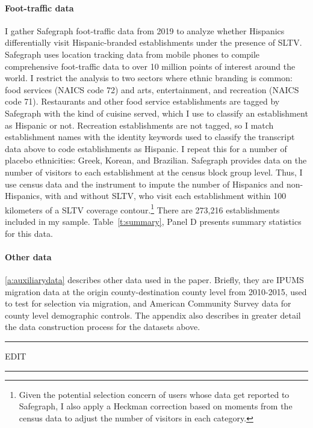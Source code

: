 \documentclass[11pt]{article}
\begin{document}
\paragraph{Foot-traffic data} I gather Safegraph foot-traffic data from 2019 to analyze whether Hispanics differentially visit Hispanic-branded establishments under the presence of SLTV. Safegraph uses location tracking data from mobile phones to compile comprehensive foot-traffic data to over 10 million points of interest around the world. I restrict the analysis to two sectors where ethnic branding is common: food services (NAICS code 72) and arts, entertainment, and recreation (NAICS code 71). Restaurants and other food service establishments are tagged by Safegraph with the kind of cuisine served, which I use to classify an establishment as Hispanic or not. Recreation establishments are not tagged, so I match establishment names with the identity keywords used to classify the transcript data above to code establishments as Hispanic. I repeat this for a number of placebo ethnicities: Greek, Korean, and Brazilian. Safegraph provides data on the number of visitors to each establishment at the census block group level. Thus, I use census data and the instrument to impute the number of Hispanics and non-Hispanics, with and without SLTV, who visit each establishment within 100 kilometers of a SLTV coverage contour.\footnote{Given the potential selection concern of users whose data get reported to Safegraph, I also apply a Heckman correction based on moments from the census data to adjust the number of visitors in each category.} There are 273,216 establishments included in my sample. Table~\ref{t:summary}, Panel D presents summary statistics for this data. 

\paragraph{Other data} \ref{a:auxiliarydata} describes other data used in the paper. Briefly, they are IPUMS migration data at the origin county-destination county level from 2010-2015, used to test for selection via migration, and American Community Survey data for county level demographic controls. The appendix also describes in greater detail the data construction process for the datasets above.


\vspace{5em}
\hrule
\vspace{.5em}
EDIT \\
\hrule
\vspace{.5em}
\end{document}
